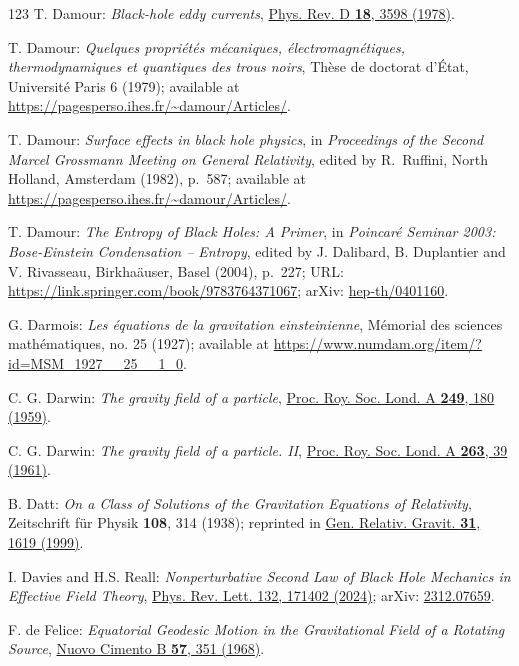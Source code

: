 \begin{thebibliography}{123}
T. Damour: {\em Black-hole eddy currents},
\href{https://doi.org/10.1103/PhysRevD.18.3598}{Phys. Rev. D {\bf 18}, 3598 (1978)}.

T. Damour: {\em Quelques propri\'et\'es m\'ecaniques, \'electromagn\'etiques,
thermo\-dy\-na\-mi\-ques et quantiques des trous noirs},
Th\`ese de doctorat d'\'Etat, Universit\'e Paris 6 (1979); available at
\url{https://pagesperso.ihes.fr/~damour/Articles/}.

T. Damour: {\em Surface effects in black hole physics},
in {\em Proceedings of the Second Marcel Grossmann Meeting on General
Relativity},
edited by R.~Ruffini, North Holland, Amsterdam (1982), p.~587; available at
\url{https://pagesperso.ihes.fr/~damour/Articles/}.

T. Damour: {\em The Entropy of Black Holes: A Primer},
in {\em Poincaré Seminar 2003: Bose-Einstein Condensation -- Entropy},
edited by J. Dalibard, B. Duplantier and V. Rivasseau, Birkha\"auser, Basel (2004),
p.~227;
URL: \url{https://link.springer.com/book/9783764371067};
arXiv: \href{https://arxiv.org/abs/hep-th/0401160}{hep-th/0401160}.

G. Darmois:
{\em Les équations de la gravitation einsteinienne},
Mémorial des sciences mathématiques, no. 25 (1927); available at
\url{https://www.numdam.org/item/?id=MSM_1927__25__1_0}.

C. G. Darwin: {\em The gravity field of a particle},
\href{https://doi.org/10.1098/rspa.1959.0015}{Proc. Roy. Soc. Lond. A {\bf 249}, 180 (1959)}.

C. G. Darwin: {\em The gravity field of a particle. II},
\href{https://doi.org/10.1098/rspa.1961.0142}{Proc. Roy. Soc. Lond. A {\bf 263}, 39 (1961)}.

B. Datt:
{\em On a Class of Solutions of the Gravitation Equations of Relativity},
Zeitschrift für Physik {\bf 108}, 314 (1938);
reprinted in
\href{https://doi.org/10.1023/A:1026742707143}{Gen. Relativ. Gravit. {\bf 31}, 1619 (1999)}.

I. Davies and H.S. Reall:
{\em Nonperturbative Second Law of Black Hole Mechanics in Effective Field Theory},
\href{https://doi.org/10.1103/PhysRevLett.132.171402}{Phys. Rev. Lett. 132, 171402 (2024)};
arXiv: \href{https://arxiv.org/abs/2312.07659}{2312.07659}.

F. de Felice:
{\em Equatorial Geodesic Motion in the Gravitational Field of a Rotating Source},
\href{https://doi.org/10.1007/BF02710207}{Nuovo Cimento B {\bf 57}, 351 (1968)}.


\end{thebibliography}
